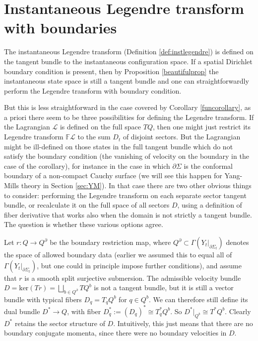 \documentclass{article}
\theoremstyle{definition}
\begin{document}
\section{Instantaneous Legendre transform with boundaries}\label{sec:legendre}

The instantaneous Legendre transform (Definition \ref{def:instlegendre}) is defined on the tangent bundle to the instantaneous configuration space. If a spatial Dirichlet boundary condition is present, then by Proposition \ref{beautifulprop} the instantaneous state space is still a tangent bundle and one can straightforwardly perform the Legendre transform with boundary condition.

But this is less straightforward in the case covered by Corollary \ref{funcorollary}, as a priori there seem to be three possibilities for defining the Legendre transform. If the Lagrangian $\mathcal{L}$ is defined on the full space $TQ$, then one might just restrict its Legendre transform $\mathbb{F}\mathcal{L}$ to the sum $D_t$ of disjoint sectors. But the Lagrangian might be ill-defined on those states in the full tangent bundle which do not satisfy the boundary condition (the vanishing of velocity on the boundary in the case of the corollary), for instance in the case in which $\partial\Sigma$ is the conformal boundary of a non-compact Cauchy surface (we will see this happen for Yang-Mills theory in Section \ref{sec:YM}). In that case there are two other obvious things to consider: performing the Legendre transform on each separate sector tangent bundle, or recalculate it on the full space of all sectors $D$, using a definition of fiber derivative that works also when the domain is not strictly a tangent bundle. The question is whether these various options agree.

Let $r\colon Q\to Q^\partial$ be the boundary restriction map, where $Q^\partial\subset \Gamma(Y_t|_{\partial\Sigma_t})$ denotes the space of allowed boundary data (earlier we assumed this to equal all of $\Gamma(Y_t|_{\partial\Sigma_t})$, but one could in principle impose further conditions), and assume that \(r\) is a smooth split
surjective submersion. The admissible velocity bundle $D=\text{ker}(Tr)=\bigsqcup_{b\in Q^\partial}TQ^b$ is not a tangent bundle, but it is still a vector bundle with typical fibers $D_q=T_qQ^b$ for $q\in Q^b$. We can therefore still define its dual bundle $D^*\to Q$, with fiber $D_q^*:=(D_q)^*\cong T_q^* Q^b$. So $D^*|_{Q^b} \cong T^*Q^b$. Clearly $D^*$ retains the sector structure of $D$. Intuitively, this just means that there are no boundary conjugate momenta, since there were no boundary velocities in $D$.
\end{document}

